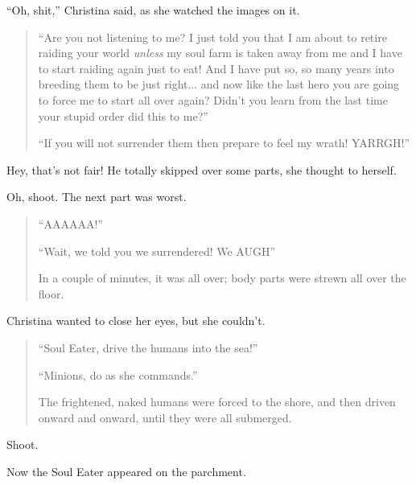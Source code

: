 \documentclass[showtrims,b6paper,draft,10pt]{memoir}
\begin{document}
``Oh, shit,'' Christina said, as she watched the images on it.

\begin{quote}
``Are you not listening to me?  I just told you that I am about to retire raiding your world \emph{unless} my soul farm is taken away from me and I have to start raiding again just to eat!  And I have put so, so many years into breeding them to be just right...  and now like the last hero you are going to force me to start all over again?  Didn't you learn from the last time your stupid order did this to me?''

``If you will not surrender them then prepare to feel my wrath!  YARRGH!''
\end{quote}

Hey, that's not fair!  He totally skipped over some parts, she thought to herself.

Oh, shoot.  The next part was worst.

\begin{quote}
``AAAAAA!''

``Wait, we told you we surrendered!  We AUGH''

In a couple of minutes, it was all over;  body parts were strewn all over the floor.
\end{quote}

Christina wanted to close her eyes, but she couldn't.

\begin{quote}
``Soul Eater, drive the humans into the sea!''

``Minions, do as she commands.''

The frightened, naked humans were forced to the shore, and then driven onward and onward, until they were all submerged.
\end{quote}

Shoot.

Now the Soul Eater appeared on the parchment.
\end{document}
